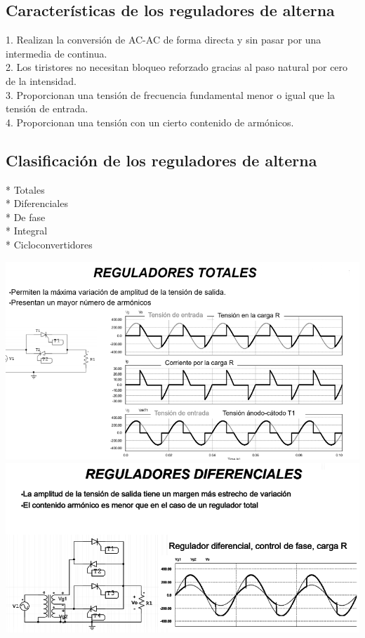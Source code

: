 \documentclass[12pt,a4paper]{article}
\begin{document}
\subsection{Características de los reguladores de alterna\\}
\begin{flushleft}
1. Realizan la conversión de AC-AC de forma directa y sin pasar por una intermedia de continua.\\
2. Los tiristores no necesitan bloqueo reforzado gracias al paso natural por cero de la intensidad.\\ 
3. Proporcionan una tensión de frecuencia fundamental menor o igual que la tensión de entrada.\\
4. Proporcionan una tensión con un cierto contenido de armónicos.\\ 
\subsection{Clasificación de los reguladores de alterna}
\end{flushleft}
\begin{flushleft}
* Totales\\
* Diferenciales\\
* De fase\\
* Integral \\
* Cicloconvertidores\\
\end{flushleft}
\includegraphics[scale=0.8]{imagenes/CA_CA_RT.PNG}\\
\linebreak
\linebreak
\includegraphics[scale=0.8]{imagenes/CA_CA_DIF.PNG}\\ 
\end{document}

